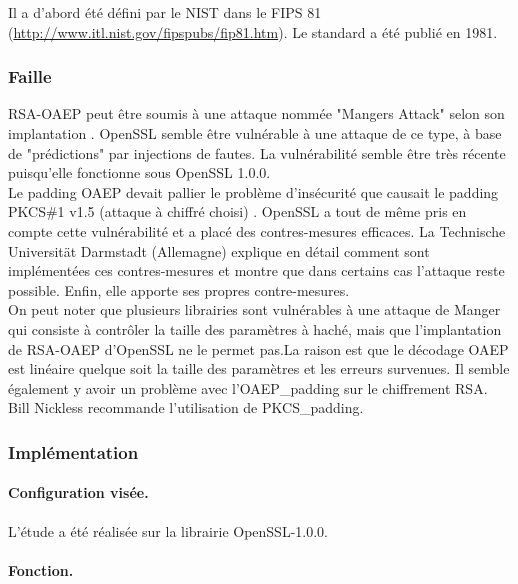 Il a d'abord été défini par le NIST dans le FIPS 81 (\url{http://www.itl.nist.gov/fipspubs/fip81.htm}). Le standard a été publié en 1981.

	
		\subsubsection{Faille}
		
			RSA-OAEP peut être soumis à une attaque nommée "Mangers Attack" selon son implantation \cite{mangers2010falko}. OpenSSL semble être vulnérable à une attaque de ce type, à base de "prédictions" par injections de fautes. La vulnérabilité semble être très récente puisqu'elle fonctionne sous OpenSSL 1.0.0.\\

			
			Le padding OAEP devait pallier le problème d'insécurité que causait le padding PKCS\#1 v1.5 (attaque à chiffré choisi) \cite{bleichenbacherPCKS}. OpenSSL a tout de même pris en compte cette vulnérabilité et a placé des contres-mesures efficaces.	La Technische Universität Darmstadt (Allemagne) explique en détail comment sont implémentées ces contres-mesures et montre que dans certains cas l'attaque reste possible. Enfin, elle apporte ses propres contre-mesures.\\
			
			On peut noter que plusieurs librairies sont vulnérables à une attaque de Manger qui consiste à contrôler la taille des paramètres à haché, mais que l'implantation de RSA-OAEP d'OpenSSL ne le permet pas.La raison est que le décodage OAEP est linéaire quelque soit la taille des paramètres et les erreurs survenues. 	Il semble également y avoir un problème avec l'OAEP\_padding sur le chiffrement RSA. Bill Nickless recommande l'utilisation de PKCS\_padding. \cite{sourceforgeRSAbroken}	\\
		
		
		\subsubsection{Implémentation}
			
			\paragraph{Configuration visée.\\}
			
			L'étude a été réalisée sur la librairie OpenSSL-1.0.0.
			
			\paragraph{Fonction.\\}
			
